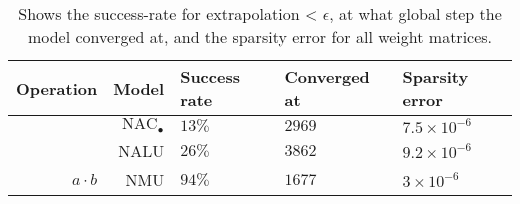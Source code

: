 \begin{table}[H]

\caption{\label{tab:very-simple-function-results}Shows the success-rate for extrapolation < $\epsilon$, at what global step the model converged at, and the sparsity error for all weight matrices.}
\centering
\begin{tabular}{rrlll}
\toprule
Operation & Model & Success rate & Converged at & Sparsity error\\
\midrule
 & ${\mathrm{NAC}_\bullet}$ & $13\%$ & $2969$ & $7.5 \times 10^{-6}$\\

 & NALU & $26\%$ & $3862$ & $9.2 \times 10^{-6}$\\

\multirow{-3}{*}{\raggedleft\arraybackslash $a \cdot b$} & NMU & $94\%$ & $1677$ & $3 \times 10^{-6}$\\
\bottomrule
\end{tabular}
\end{table}
